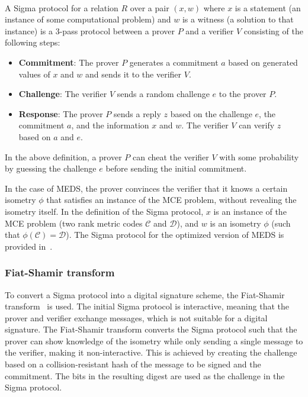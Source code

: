 \documentclass[11pt,a4paper]{report}
\theoremstyle{definition}
\begin{document}
\begin{definition}~\\
  \label{def:sigmaprotocol}
  A Sigma protocol for a relation $R$ over a pair $(x, w)$ where $x$ is a statement (an instance of some computational problem) and $w$ is a witness (a solution to that instance) is a 3-pass protocol between a prover $P$ and a verifier $V$ consisting of the following steps:
  \begin{itemize}
    \item \textbf{Commitment}: The prover $P$ generates a commitment $a$ based on generated values of $x$ and $w$ and sends it to the verifier $V$.
    \item \textbf{Challenge}: The verifier $V$ sends a random challenge $e$ to the prover $P$.
    \item \textbf{Response}: The prover $P$ sends a reply $z$ based on the challenge $e$, the commitment $a$, and the information $x$ and $w$. The verifier $V$ can verify $z$ based on $a$ and $e$.
  \end{itemize}
\end{definition}

In the above definition, a prover $P$ can cheat the verifier $V$ with some probability by guessing the challenge $e$ before sending the initial commitment.

In the case of MEDS, the prover convinces the verifier that it knows a certain isometry $\phi$ that satisfies an instance of the MCE problem, without revealing the isometry itself. In the definition of the Sigma protocol, $x$ is an instance of the MCE problem (two rank metric codes $\mathcal{C}$ and $\mathcal{D}$), and $w$ is an isometry $\phi$ (such that $\phi(\mathcal{C}) = \mathcal{D}$). The Sigma protocol for the optimized version of MEDS is provided in~\cite[Section~4.2]{chou2024reducing}.

\subsubsection{Fiat-Shamir transform}
\label{sec:fiatshamir}
To convert a Sigma protocol into a digital signature scheme, the Fiat-Shamir transform~\cite{fiat1986prove} is used. The initial Sigma protocol is interactive, meaning that the prover and verifier exchange messages, which is not suitable for a digital signature. The Fiat-Shamir transform converts the Sigma protocol such that the prover can show knowledge of the isometry while only sending a single message to the verifier, making it non-interactive. This is achieved by creating the challenge based on a collision-resistant hash of the message to be signed and the commitment. The bits in the resulting digest are used as the challenge in the Sigma protocol.
\end{document}
